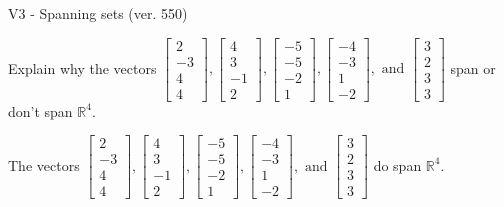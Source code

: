 \begin{exercise}
  \begin{exerciseTitle}V3 - Spanning sets (ver. 550)\end{exerciseTitle}
  \begin{exerciseStatement}
    Explain why the vectors \(\left[\begin{array}{r}
2 \\
-3 \\
4 \\
4
\end{array}\right] , \left[\begin{array}{r}
4 \\
3 \\
-1 \\
2
\end{array}\right] , \left[\begin{array}{r}
-5 \\
-5 \\
-2 \\
1
\end{array}\right] , \left[\begin{array}{r}
-4 \\
-3 \\
1 \\
-2
\end{array}\right] , \text{ and } \left[\begin{array}{r}
3 \\
2 \\
3 \\
3
\end{array}\right]\) span or don't span \(\mathbb{R}^4\). 
	


  \end{exerciseStatement}
  \begin{exerciseAnswer}
   The vectors \(\left[\begin{array}{r}
2 \\
-3 \\
4 \\
4
\end{array}\right] , \left[\begin{array}{r}
4 \\
3 \\
-1 \\
2
\end{array}\right] , \left[\begin{array}{r}
-5 \\
-5 \\
-2 \\
1
\end{array}\right] , \left[\begin{array}{r}
-4 \\
-3 \\
1 \\
-2
\end{array}\right] , \text{ and } \left[\begin{array}{r}
3 \\
2 \\
3 \\
3
\end{array}\right]\) 
  	 do  
	span \(\mathbb{R}^4\).
  



\end{exerciseAnswer}
\end{exercise}
